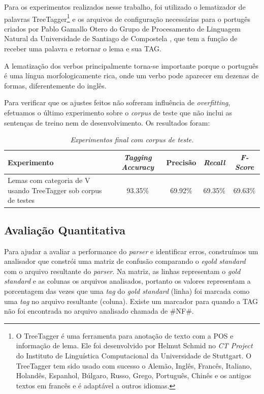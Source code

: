 Para os experimentos realizados nesse trabalho, foi utilizado o lematizador de palavras TreeTagger\footnote{O TreeTagger é uma ferramenta para anotação de texto com a POS e informação de lema. Ele foi desenvolvido por Helmut Schmid no \emph{CT Project} do Instituto de Linguística Computacional da Universidade de Stuttgart. O TreeTagger tem sido usado com sucesso o Alemão, Inglês, Francês, Italiano, Holandês, Espanhol, Búlgaro, Russo, Grego, Português, Chinês e os antigos textos em francês e é adaptável a outros idiomas.} \cite{treetagger} e os arquivos de configuração necessárias para o portugês criados por Pablo Gamallo Otero do Grupo de Procesamento de Linguagem Natural da Universidade de Santiago de Compostela \cite{gamallootero}, que tem a função de receber uma palavra e retornar o lema e sua TAG.

A lematização dos verbos principalmente torna-se importante porque o português é uma língua morfologicamente rica, onde um verbo pode aparecer em dezenas de formas, diferentemente do inglês.

Para verificar que os ajustes feitos não sofreram influência de \emph{overfitting}, efetuamos o último experimento sobre o \emph{corpus} de teste que não inclui as sentenças de treino nem de desenvolvimento. Os resultados foram:

\begin{table}[H]
\centering
\footnotesize
\caption{\it Experimentos final com \emph{corpus} de teste.}
	\begin{tabular}{|p{7cm}|c|c|c|c|}
		\hline
		\textbf{Experimento} &  \textbf{\emph{Tagging Accuracy}} & \textbf{Precisão} & \textbf{\emph{Recall}} & \textbf{\emph{F-Score}} \\
		\hline
		Lemas com categoria de V usando TreeTagger sob corpus de testes & 93.35\% & 69.92\% & 69.35\% & 69.63\%\\
		\hline		
	\end{tabular}
	\label{tab:experimento_corpus_teste}
\end{table}

\subsection{Avaliação Quantitativa}

Para ajudar a avaliar a performance do \emph{parser} e identificar erros, construímos um analisador que constrói uma matriz de confusão comparando o \emph{egold standard} com o arquivo resultante do \emph{parser}. Na matriz, as linhas representam o \emph{gold standard} e as colunas os arquivos analisados, portanto os valores representam a porcentagem das vezes que uma \emph{tag} do \emph{gold standard} (linha) foi marcada como uma \emph{tag} no arquivo resultante (coluna). Existe um marcador para quando a TAG não foi encontrada no arquivo analisado chamada de {\#NF\#}. 

